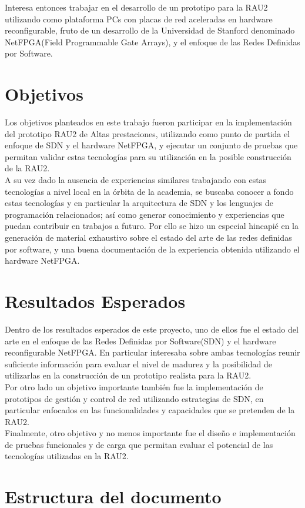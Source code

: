 Interesa entonces trabajar en el desarrollo de un prototipo para la RAU2 utilizando como plataforma PCs con placas de red aceleradas en hardware reconfigurable, fruto de un desarrollo de la Universidad de Stanford denominado NetFPGA(Field Programmable Gate Arrays)\citep{NetFPGA}, y el enfoque de las Redes Definidas por Software.

\section{Objetivos}
Los objetivos planteados en este trabajo fueron participar en la implementación del prototipo RAU2 de Altas prestaciones, utilizando como punto de partida el enfoque de SDN y el hardware NetFPGA, y ejecutar un conjunto de pruebas que permitan validar estas tecnologías para su utilización en  la posible construcción de la RAU2.\\

A su vez dado la ausencia de experiencias similares  trabajando con estas tecnologías a nivel local en la órbita de la academia, se buscaba conocer a fondo estas tecnologías y en particular la arquitectura de SDN y los lenguajes de programación relacionados;  así como generar conocimiento y experiencias que puedan contribuir en trabajos a futuro. Por ello se hizo un especial hincapié en la generación de material exhaustivo sobre el estado del arte de las redes definidas por software, y una buena documentación de la experiencia obtenida utilizando el hardware NetFPGA.

\section{Resultados Esperados}
Dentro de los resultados esperados de este proyecto, uno de ellos fue el estado del arte en el enfoque de las Redes Definidas por Software(SDN) y el hardware reconfigurable NetFPGA. En particular interesaba sobre ambas tecnologías reunir suficiente información para evaluar el nivel de madurez y la posibilidad de utilizarlas en la construcción de un prototipo realista para la RAU2.\\
                   
Por otro lado un objetivo importante también fue la implementación de prototipos de gestión y control de red utilizando estrategias de SDN, en particular enfocados en las funcionalidades y capacidades que se pretenden de la RAU2.\\

Finalmente, otro objetivo y no menos importante fue el diseño e implementación de pruebas funcionales y de carga que permitan evaluar el potencial de las tecnologías utilizadas en la RAU2.

\section{Estructura del documento}

